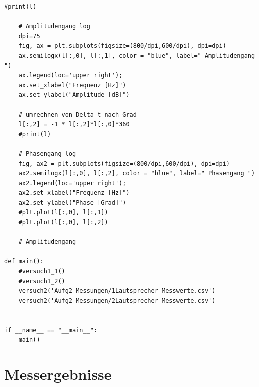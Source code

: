 \documentclass[12pt,oneside,a4paper]{report}
\begin{document}
\begin{lstlisting}[style=PYTHON, frame=single, caption=QuellCodeV1 bis V2, captionpos=b, label=lst:Code]
    #print(l)
    
    # Amplitudengang log
    dpi=75
    fig, ax = plt.subplots(figsize=(800/dpi,600/dpi), dpi=dpi)
    ax.semilogx(l[:,0], l[:,1], color = "blue", label=" Amplitudengang ")
    ax.legend(loc='upper right');
    ax.set_xlabel("Frequenz [Hz]")
    ax.set_ylabel("Amplitude [dB]")
        
    # umrechnen von Delta-t nach Grad
    l[:,2] = -1 * l[:,2]*l[:,0]*360
    #print(l)
    
    # Phasengang log
    fig, ax2 = plt.subplots(figsize=(800/dpi,600/dpi), dpi=dpi)
    ax2.semilogx(l[:,0], l[:,2], color = "blue", label=" Phasengang ")
    ax2.legend(loc='upper right');
    ax2.set_xlabel("Frequenz [Hz]")
    ax2.set_ylabel("Phase [Grad]")
    #plt.plot(l[:,0], l[:,1])
    #plt.plot(l[:,0], l[:,2])
        
    # Amplitudengang     

def main():    
    #versuch1_1()
    #versuch1_2()
    versuch2('Aufg2_Messungen/1Lautsprecher_Messwerte.csv')
    versuch2('Aufg2_Messungen/2Lautsprecher_Messwerte.csv')
    
    
if __name__ == "__main__":
    main()

\end{lstlisting}

\section{Messergebnisse}
\label{chap:APPENDIX_MEASUREMENT_SOURCE}
\end{document}
